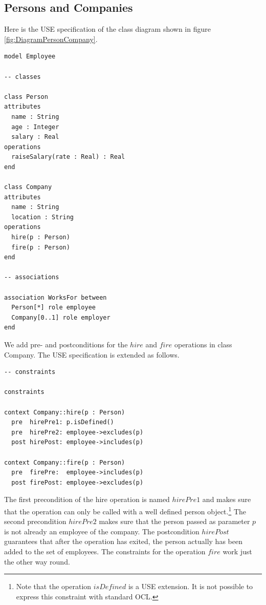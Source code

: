 \documentclass[a4paper,titlepage,oneside,final]{scrreprt} %
\begin{document}
\subsection{Persons and Companies}\label{personCompanySpec}
Here is the USE specification of the class diagram shown in figure \ref{fig:DiagramPersonCompany}.
\begin{verbatim}
model Employee

-- classes

class Person
attributes
  name : String
  age : Integer
  salary : Real
operations
  raiseSalary(rate : Real) : Real
end

class Company
attributes
  name : String
  location : String
operations
  hire(p : Person)
  fire(p : Person)
end

-- associations

association WorksFor between
  Person[*] role employee
  Company[0..1] role employer
end
\end{verbatim}
We add pre- and postconditions for the $\mathit{hire}$ and $\mathit{fire}$ operations
in class Company. The USE specification is extended as follows.
\begin{verbatim}
-- constraints

constraints

context Company::hire(p : Person)
  pre  hirePre1: p.isDefined()
  pre  hirePre2: employee->excludes(p)
  post hirePost: employee->includes(p)

context Company::fire(p : Person)
  pre  firePre:  employee->includes(p)
  post firePost: employee->excludes(p)
\end{verbatim}
The first precondition of the hire operation is named $\mathit{hirePre1}$ and makes sure
that the operation can only be called with a well defined person object.\footnote{Note that the
operation $\mathit{isDefined}$ is a USE extension. It is not possible
to express this constraint with standard OCL.} The second precondition $\mathit{hirePre2}$
makes sure that the person passed as parameter $p$ is not already an employee of
the company. The postcondition $\mathit{hirePost}$ guarantees that after the operation
has exited, the person actually has been added to the set of employees.
The constraints for the operation $\mathit{fire}$ work just the other way round.
\end{document}
